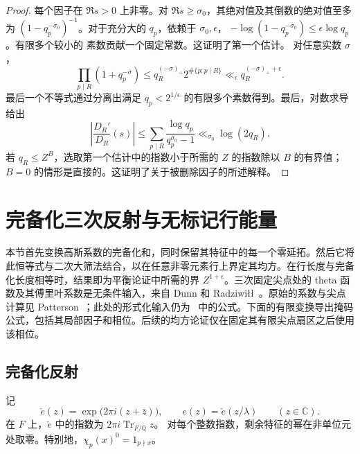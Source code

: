 \documentclass[11pt,a4paper]{article}
\numberwithin{equation}{section}
\numberwithin{figure}{section}
\theoremstyle{definition}
\theoremstyle{remark}
\begin{document}
\begin{proof}
每个因子在 $\Re s>0$ 上非零。对 $\Re s\ge\sigma_0$，其绝对值及其倒数的绝对值至多为
$(1-q_p^{-\sigma_0})^{-1}$。对于充分大的 $q_p$，依赖于
$\sigma_0,\epsilon$，
$-\log(1-q_p^{-\sigma_0})\le\epsilon\log q_p$。有限多个较小的
素数贡献一个固定常数。这证明了第一个估计。
对任意实数 $\sigma$，
\[
 \prod_{p\mid R}(1+q_p^{-\sigma})
 \le q_R^{(-\sigma)_+}2^{\#\{p:p\mid R\}}
 \ll_\epsilon q_R^{(-\sigma)_++\epsilon}.
\]
最后一个不等式通过分离出满足
$q_p<2^{1/\epsilon}$ 的有限多个素数得到。最后，对数求导给出
\[
 \left|\frac{D_R'}{D_R}(s)\right|
 \le\sum_{p\mid R}\frac{\log q_p}{q_p^{\sigma_0}-1}
 \ll_{\sigma_0}\log(2q_R).
\]
若 $q_R\le Z^B$，选取第一个估计中的指数小于所需的 $Z$ 的指数除以 $B$ 的有界值；$B=0$ 的情形是直接的。这证明了关于被删除因子的所述解释。
\end{proof}

\section{完备化三次反射与无标记行能量}
\label{sec:completed-reflection}

本节首先变换高斯系数的完备化和，同时保留其特征中的每一个零延拓。然后它将此恒等式与二次大筛法结合，以在任意非零元素行上界定其均方。在行长度与完备化长度相等时，结果即为平衡论证中所需的界 $Z^{1+\epsilon}$。三次固定尖点处的 theta 函数及其傅里叶系数是无条件输入，来自 Dunn 和 Radziwi{\l}{\l}~\cite[第 5 节和附录 A]{DR}。原始的系数与尖点计算见 Patterson~\cite[定理 8.1 和第 7--8 节]{Patterson}；此处的形式化输入仍为~\cite{DR} 中的公式。下面的有限变换导出掩码公式，包括其局部因子和相位。后续的均方论证仅在固定其有限尖点扇区之后使用该相位。

\subsection{完备化反射}

记
\[
 \check e(z)=\exp\bigl(2\pi i(z+\bar z)\bigr),
 \qquad e(z)=\check e(z/\lambda)\qquad(z\in\mathbb C).
\]
在 $F$ 上，$\check e$ 中的指数为 $2\pi i\operatorname{Tr}_{F/\mathbb Q}z$。
对每个整数指数，剩余特征的幂在非单位元处取零。特别地，$\chi_p(x)^0=1_{p\nmid x}$。
\end{document}
